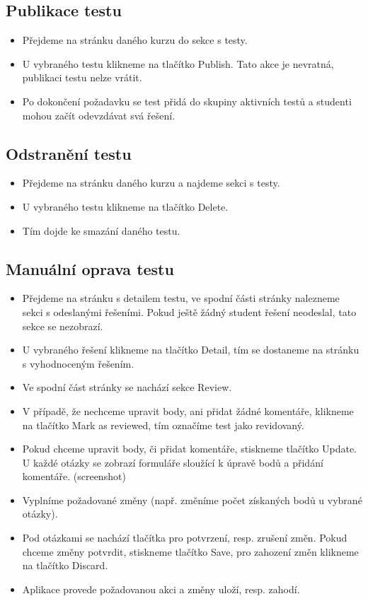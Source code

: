 \subsection{Publikace testu}
\begin{itemize}
	\item Přejdeme na stránku daného kurzu do sekce s testy.
	\item U vybraného testu klikneme na tlačítko Publish. Tato akce je nevratná, publikaci testu nelze vrátit.
	\item Po dokončení požadavku se test přidá do skupiny aktivních testů a studenti mohou začít odevzdávat svá řešení.
\end{itemize}

\subsection{Odstranění testu}
\begin{itemize}
	\item Přejdeme na stránku daného kurzu a najdeme sekci s testy.
	\item U vybraného testu klikneme na tlačítko Delete.
	\item Tím dojde ke smazání daného testu.
\end{itemize}

\subsection{Manuální oprava testu}
\begin{itemize}
	\item Přejdeme na stránku s detailem testu, ve spodní části stránky nalezneme sekci s odeslanými řešeními. Pokud ještě žádný student řešení neodeslal, tato sekce se nezobrazí.
	\item U vybraného řešení klikneme na tlačítko Detail, tím se dostaneme na stránku s vyhodnoceným řešením.
	\item Ve spodní část stránky se nachází sekce Review.
	\item V případě, že nechceme upravit body, ani přidat žádné komentáře, klikneme na tlačítko Mark as reviewed, tím označíme test jako revidovaný.
	\item Pokud chceme upravit body, či přidat komentáře, stiskneme tlačítko Update. U každé otázky se zobrazí formuláře sloužící k úpravě bodů a přidání komentáře. (screenshot)
	\item Vyplníme požadované změny (např. změníme počet získaných bodů u vybrané otázky).
	\item Pod otázkami se nachází tlačítka pro potvrzení, resp. zrušení změn. Pokud chceme změny potvrdit, stiskneme tlačítko Save, pro zahození změn klikneme na tlačítko Discard.
	\item Aplikace provede požadovanou akci a změny uloží, resp. zahodí.
\end{itemize}

